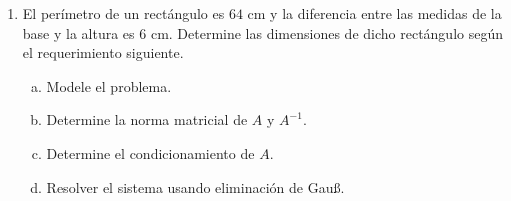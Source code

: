 \documentclass[
	spanish,
	9pt,
	utf8,
	xcolor=table,
	handout,
	aspectratio=1610,
	professionalfonts,
	notheorems,
	mathserif,
]{beamer}
\newcounter{savedenum}
\newcommand*{\saveenum}{\setcounter{savedenum}{\theenumi}}
\begin{document}
\begin{frame}
\begin{enumerate}
\begin{multicols}{2}
\begin{enumerate}[a)]
				            Determine el condicionamiento de $A$.

				      \item

				            Resolver el sistema usando eliminación de Gauß.
			      \end{enumerate}
		      \end{multicols}

		\item
		      El perímetro de un rectángulo es $64$ cm y la diferencia entre las medidas de la base y la altura es $6$ cm.
		      Determine las dimensiones de dicho rectángulo según el requerimiento siguiente.

		      \begin{multicols}{2}
			      \begin{enumerate}[a)]
				      \item

				            Modele el problema.

				      \item

				            Determine la norma matricial de $A$ y $A^{-1}$.

				      \item

				            Determine el condicionamiento de $A$.

				      \item

				            Resolver el sistema usando eliminación de Gauß.
			      \end{enumerate}
		      \end{multicols}

		      \saveenum
	\end{enumerate}
\end{frame}
\end{document}
